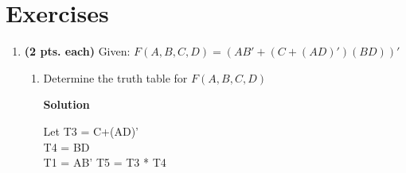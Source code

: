 \section{Exercises}
\label{section:representationsExercises}
\graphicspath{ {./chapter02/FigHw} }

\begin{enumerate}
    \item \textbf{(2 pts. each)} Given: $F(A,B,C,D) = (AB' + (C+(AD)')(BD))'$

        \begin{enumerate}
            \item Determine the truth table for $F(A,B,C,D)$

                \begin{onlysolution}  \textbf{Solution} \itshape

                    Let T3 = C+(AD)'\\
                    T4 = BD\\
                    T1 = AB'
                    T5 = T3 * T4\\


\end{onlysolution}
\end{enumerate}
\end{enumerate}
